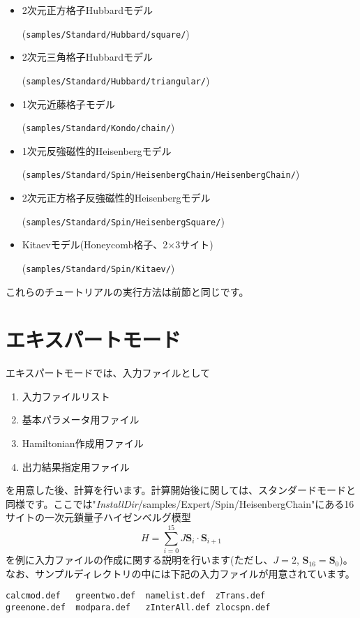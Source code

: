 \begin{itemize}
\item 2次元正方格子Hubbardモデル

  (\verb|samples/Standard/Hubbard/square/|)
\item 2次元三角格子Hubbardモデル

  (\verb|samples/Standard/Hubbard/triangular/|)
\item 1次元近藤格子モデル

  (\verb|samples/Standard/Kondo/chain/|)
\item 1次元反強磁性的Heisenbergモデル

  (\verb|samples/Standard/Spin/HeisenbergChain/HeisenbergChain/|)
\item 2次元正方格子反強磁性的Heisenbergモデル

  (\verb|samples/Standard/Spin/HeisenbergSquare/|)
\item Kitaevモデル(Honeycomb格子、2$\times$3サイト)

  (\verb|samples/Standard/Spin/Kitaev/|)

\end{itemize}

これらのチュートリアルの実行方法は前節と同じです。

\newpage
\section{エキスパートモード}
エキスパートモードでは、入力ファイルとして
\begin{enumerate}
\item 入力ファイルリスト
\item 基本パラメータ用ファイル
\item Hamiltonian作成用ファイル
\item 出力結果指定用ファイル
\end{enumerate}
を用意した後、計算を行います。計算開始後に関しては、スタンダードモードと同様です。ここでは"{\it InstallDir}/samples/Expert/Spin/HeisenbergChain"にある16サイトの一次元鎖量子ハイゼンベルグ模型
\begin{equation}
H=\sum_{i=0}^{15} J {\bm S}_i\cdot {\bm S}_{i+1}
\end{equation}
を例に入力ファイルの作成に関する説明を行います(ただし、$J=2$, ${\bm S}_{16}={\bm S}_{0}$)。なお、サンプルディレクトリの中には下記の入力ファイルが用意されています。\\
\begin{minipage}{15cm}
\begin{screen}
\begin{verbatim}
calcmod.def   greentwo.def  namelist.def  zTrans.def
greenone.def  modpara.def   zInterAll.def zlocspn.def
\end{verbatim}
\end{screen}
\end{minipage}


